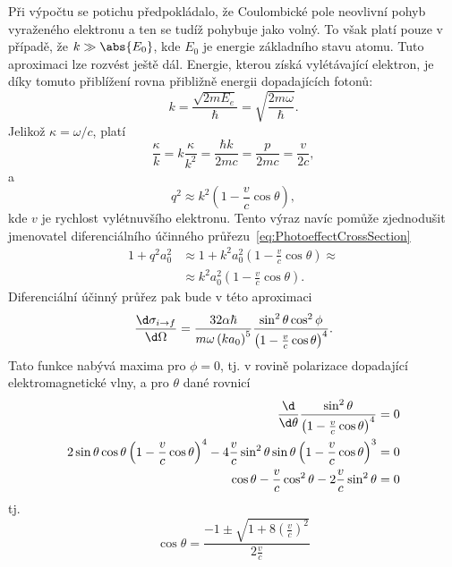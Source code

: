 \begin{solution}
	Při výpočtu se potichu předpokládalo, že Coulombické pole neovlivní pohyb vyraženého elektronu a ten se tudíž pohybuje jako volný.
	To však platí pouze v případě, že $k\gg\abs{E_{0}}$, kde $E_{0}$ je energie základního stavu atomu.
	Tuto aproximaci lze rozvést ještě dál.
	Energie, kterou získá vylétávající elektron, je díky tomuto přiblížení rovna přibližně energii dopadajících fotonů:
	\begin{equation}
		k=\frac{\sqrt{2mE_{e}}}{\hbar}
		 =\sqrt{\frac{2m\omega}{\hbar}}.
	\end{equation}
	Jelikož $\kappa=\omega/c$, platí
	\begin{equation}
		\frac{\kappa}{k}
			=k\frac{\kappa}{k^{2}}
			=\frac{\hbar k}{2mc}
			=\frac{p}{2mc}
			=\frac{v}{2c},
	\end{equation}
	a
	\begin{equation}
		q^{2}\approx k^{2}\left(1-\frac{v}{c}\cos{\theta}\right),
	\end{equation}
	kde $v$ je rychlost vylétnuvšího elektronu.
	Tento výraz navíc pomůže zjednodušit jmenovatel diferenciálního účinného průřezu~\eqref{eq:PhotoeffectCrossSection}
	\begin{align}
		1+q^{2}a_{0}^{2}
			&\approx1+k^{2}a_{0}^{2}\left(1-\frac{v}{c}\cos{\theta}\right)\approx\nonumber\\
			&\approx k^{2}a_{0}^{2}\left(1-\frac{v}{c}\cos{\theta}\right).
	\end{align}
	Diferenciální účinný průřez pak bude v této aproximaci
	\begin{equation}
		\frac{\d\sigma_{i\rightarrow f}}{\d\Omega}
			=\frac{32\alpha\hbar}{m\omega\left(ka_{0}\right)^{5}}
				\frac{\sin^{2}\theta\cos^{2}\phi}{\left(1-\frac{v}{c}\cos{\theta}\right)^{4}}.
	\end{equation}
	Tato funkce nabývá maxima pro $\phi=0$, tj. v rovině polarizace dopadající elektromagnetické vlny, a pro $\theta$ dané rovnicí
	\begin{align}
		\frac{\d}{\d\theta}\frac{\sin^{2}\theta}{\left(1-\frac{v}{c}\cos{\theta}\right)^{4}}
			&=0\nonumber\\
		2\sin{\theta}\cos{\theta}\left(1-\frac{v}{c}\cos{\theta}\right)^{4}
			-4\frac{v}{c}\sin^{2}\theta\sin{\theta}\left(1-\frac{v}{c}\cos{\theta}\right)^{3}
			&=0\nonumber\\
		\cos{\theta}-\frac{v}{c}\cos^{2}\theta-2\frac{v}{c}\sin^{2}\theta
			&=0
	\end{align}
	tj.
	\begin{equation}
		\cos{\theta}
			=\frac{-1\pm\sqrt{1+8\left(\frac{v}{c}\right)^{2}}}{2\frac{v}{c}}

\end{equation}
\end{solution}
